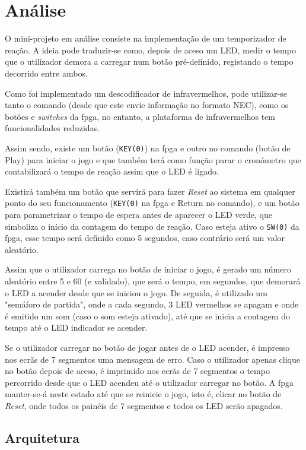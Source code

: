 \documentclass[a4paper,11pt,onecolumn]{report}
\begin{document}
\chapter{Análise}
\label{chap.analise}
O mini-projeto em análise consiste na implementação de um temporizador de reação. A ideia pode traduzir-se como, depois de aceso um LED, medir o tempo que o utilizador demora a carregar num botão pré-definido, registando o tempo decorrido entre ambos. 

Como foi implementado um descodificador de infravermelhos, pode utilizar-se tanto o comando (desde que este envie informação no formato NEC), como os botões e \textit{switches} da \ac{fpga}, no entanto, a plataforma de infravermelhos tem funcionalidades reduzidas.

Assim sendo, existe um botão (\texttt{KEY(0)}) na \ac{fpga} e outro no comando (botão de Play) para iniciar o jogo e que também terá como função parar o cronómetro que contabilizará o tempo de reação assim que o LED é ligado.

Existirá também um botão que servirá para fazer \textit{Reset} ao sistema em qualquer ponto do seu funcionamento (\texttt{KEY(0)} na \ac{fpga} e Return no comando), e um botão para parametrizar o tempo de espera antes de aparecer o LED verde, que simboliza o início da contagem do tempo de reação. Caso esteja ativo o \texttt{SW(0)} da \ac{fpga}, esse tempo será definido como 5 segundos, caso contrário será um valor aleatório.

Assim que o utilizador carrega no botão de iniciar o jogo, é gerado um número aleatório entre 5 e 60 (e validado), que será o tempo, em segundos, que demorará o LED a acender desde que se iniciou o jogo. De seguida, é utilizado um "semáforo de partida", onde a cada segundo, 3 LED vermelhos se apagam e onde é emitido um som (caso o som esteja ativado), até que se inicia a contagem do tempo até o LED indicador se acender.

Se o utilizador carregar no botão de jogar antes de o LED acender, é impresso nos ecrãs de 7 segmentos uma mensagem de erro. Caso o utilizador apenas clique no botão depois de aceso, é imprimido nos ecrãs de 7 segmentos o tempo percorrido desde que o LED acendeu até o utilizador carregar no botão. A \ac{fpga} manter-se-á neste estado até que se reinicie o jogo, isto é, clicar no botão de \textit{Reset}, onde todos os painéis de 7 segmentos e todos os LED serão apagados.

\section{Arquitetura}
\end{document}
